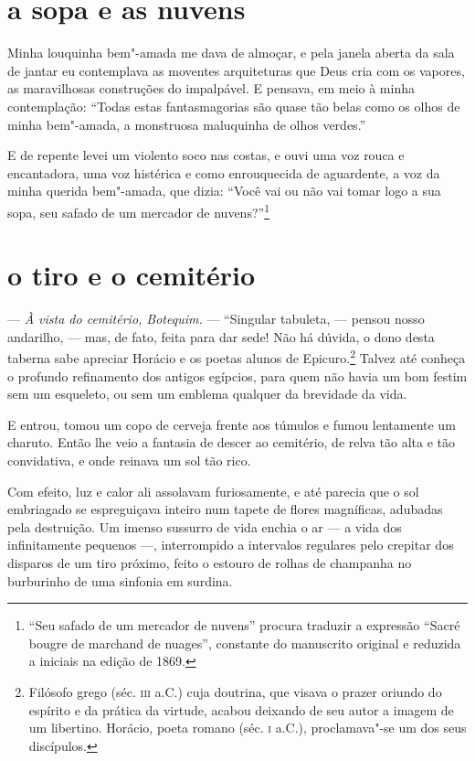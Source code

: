 \quebra\section[A sopa e as nuvens]{a sopa e as nuvens}

Minha louquinha bem"-amada me dava de almoçar, e pela janela aberta da
sala de jantar eu contemplava as moventes arquiteturas que Deus cria com
os vapores, as maravilhosas construções do impalpável. E pensava,
em meio à minha contemplação: “Todas estas
fantasmagorias são quase tão belas como os olhos de minha
bem"-amada, a monstruosa maluquinha de olhos verdes.”

E de repente levei um violento soco nas costas, e ouvi uma voz rouca e
encantadora, uma voz histérica e como enrouquecida de aguardente,
a voz da minha querida bem"-amada, que dizia: “Você
vai ou não vai tomar logo a sua sopa, seu safado de um mercador de
nuvens?''\protect\footnote{ “Seu safado de um mercador de nuvens'' 
procura traduzir a expressão “Sacré bougre de marchand de
nuages'', constante do manuscrito original e reduzida a
iniciais na edição de 1869.}

\quebra\section[O tiro e o cemitério]{o tiro e o cemitério}

--- \textit{À vista do cemitério, Botequim.} --- “Singular tabuleta, ---
pensou nosso andarilho, --- mas, de fato, feita para dar sede! Não há dúvida, o dono desta taberna sabe apreciar Horácio e os poetas alunos
de Epicuro.\protect\footnote{  Filósofo grego (séc. \textsc{iii} a.C.) cuja doutrina, que
visava o prazer oriundo do espírito e da prática da virtude, acabou
deixando de seu autor a imagem de um libertino. Horácio, poeta romano
(séc. \textsc{i} a.C.), proclamava"-se um dos seus discípulos.} Talvez até conheça o
profundo refinamento dos antigos egípcios, para quem não havia um bom festim sem um
esqueleto, ou sem um emblema qualquer da brevidade da
vida.

E entrou, tomou um copo de cerveja frente aos túmulos e fumou
lentamente um charuto. Então lhe veio a fantasia de descer ao
cemitério, de relva tão alta e tão convidativa, e onde reinava um
sol tão rico.

Com efeito, luz e calor ali assolavam furiosamente, e até parecia que o sol embriagado se espreguiçava inteiro num tapete de
flores magníficas, adubadas pela destruição. Um imenso sussurro de vida
enchia o ar --- a vida dos infinitamente pequenos ---, interrompido a
intervalos regulares pelo crepitar dos disparos de um tiro próximo, 
feito o estouro de rolhas de champanha no burburinho de uma
sinfonia em surdina.

